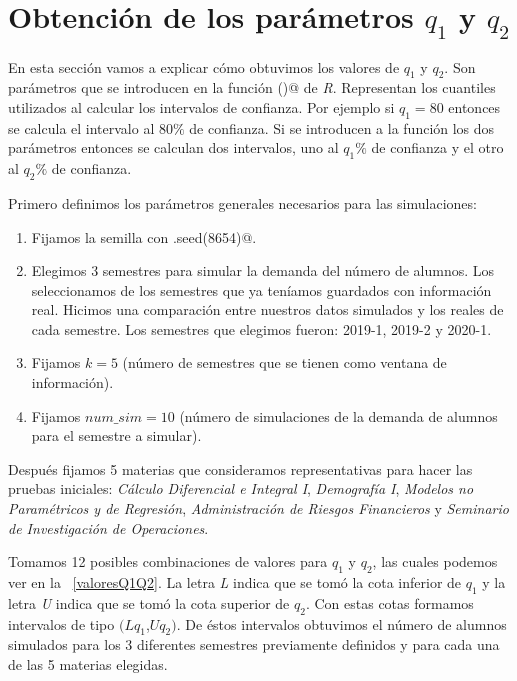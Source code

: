 \section{Obtención de los parámetros $q_{1}$ y $q_{2}$}

En esta sección vamos a explicar cómo obtuvimos los valores de $q_{1}$ y $q_{2}$. Son parámetros que se introducen en la función \verb@hw()@ de \textit{R}. Representan los cuantiles utilizados al calcular los intervalos de confianza. Por ejemplo si $q_{1} = 80$ entonces se calcula el intervalo al $80\%$ de confianza. Si se introducen a la función los dos parámetros entonces se calculan dos intervalos, uno al $q_{1}\%$ de confianza y el otro al $q_{2}\%$ de confianza.

Primero definimos los parámetros generales necesarios para las simulaciones:
  
  \begin{enumerate}
\item Fijamos la semilla con \verb@set.seed(8654)@.

\item Elegimos 3 semestres para simular la demanda del número de alumnos. Los seleccionamos de los semestres que ya teníamos guardados con información real. Hicimos una comparación entre nuestros datos simulados y los reales de cada semestre. Los semestres que elegimos fueron: 2019-1, 2019-2 y 2020-1.

\item Fijamos $k = 5$ (número de semestres que se tienen como ventana de información).

\item Fijamos $num\_sim = 10$ (número de simulaciones de la demanda de alumnos para el semestre a simular).
\end{enumerate}


Después fijamos 5 materias que consideramos representativas para hacer las pruebas iniciales: \textit{Cálculo Diferencial e Integral I}, \textit{Demografía I}, \textit{Modelos no Paramétricos y de Regresión}, \textit{Administración de Riesgos Financieros} y \textit{Seminario de Investigación de Operaciones}.

Tomamos 12 posibles combinaciones de valores para $q_{1}$ y $q_{2}$, las cuales podemos ver en la \tablename{~\ref{valoresQ1Q2}}. La letra \textit{L} indica que se tomó la cota inferior de $q_{1}$ y la letra \textit{U} indica que se tomó la cota superior de $q_{2}$. Con estas cotas formamos intervalos de tipo $(Lq_{1}$,$Uq_{2})$. De éstos intervalos obtuvimos el número de alumnos simulados para los 3 diferentes semestres previamente definidos y para cada una de las 5 materias elegidas.

